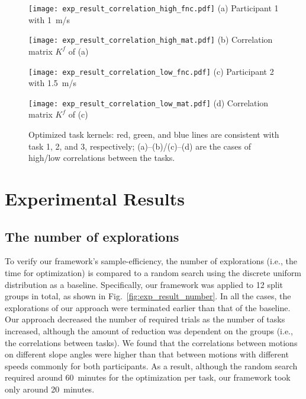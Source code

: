 \documentclass[twocolumn]{svjour3}          %
\begin{document}
\begin{figure}[tb]
    \centering
    \begin{minipage}[]{0.55\linewidth}
        \centering
        \texttt{[image: exp\_result\_correlation\_high\_fnc.pdf]}
        {(a) Participant 1 with 1~m/s}
    \end{minipage}
    \begin{minipage}[]{0.4\linewidth}
        \centering
        \texttt{[image: exp\_result\_correlation\_high\_mat.pdf]}
        {(b) Correlation matrix $K^f$ of (a)}
    \end{minipage}
    \begin{minipage}[]{0.55\linewidth}
        \centering
        \texttt{[image: exp\_result\_correlation\_low\_fnc.pdf]}
        {(c) Participant 2 with 1.5~m/s}
    \end{minipage}
    \begin{minipage}[]{0.4\linewidth}
        \centering
        \texttt{[image: exp\_result\_correlation\_low\_mat.pdf]}
        {(d) Correlation matrix $K^f$ of (c)}
    \end{minipage}
    \caption{Optimized task kernels:
    red, green, and blue lines are consistent with task 1, 2, and 3, respectively;
    (a)--(b)/(c)--(d) are the cases of high/low correlations between the tasks.
    }
    \label{fig:exp_result_correlation}
\end{figure}

\section{Experimental Results}
\label{sec:result}

\subsection{The number of explorations}

To verify our framework's sample-efficiency, the number of explorations (i.e., the time for optimization) is compared to a random search using the discrete uniform distribution as a baseline.
Specifically, our framework was applied to 12 split groups in total, as shown in Fig.~\ref{fig:exp_result_number}.
In all the cases, the explorations of our approach were terminated earlier than that of the baseline.
Our approach decreased the number of required trials as the number of tasks increased, although the amount of reduction was dependent on the groups (i.e., the correlations between tasks).
We found that the correlations between motions on different slope angles were higher than that between motions with different speeds commonly for both participants.
As a result, although the random search required around 60~minutes for the optimization per task, our framework took only around 20~minutes.
\end{document}
